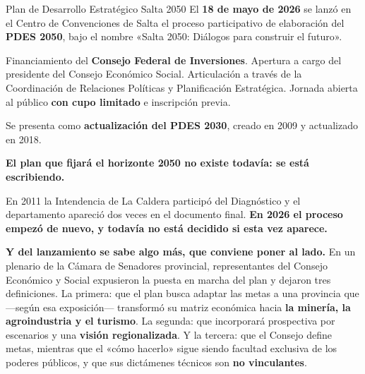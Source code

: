 \begin{ficha}{Plan de Desarrollo Estratégico Salta 2050}
El \textbf{18 de mayo de 2026} se lanzó en el Centro de Convenciones de Salta el proceso
participativo de elaboración del \textbf{PDES 2050}, bajo el nombre «Salta 2050: Diálogos para
construir el futuro».

Financiamiento del \textbf{Consejo Federal de Inversiones}. Apertura a cargo del presidente del
Consejo Económico Social. Articulación a través de la Coordinación de Relaciones Políticas y
Planificación Estratégica. Jornada abierta al público \textbf{con cupo limitado} e inscripción
previa.

Se presenta como \textbf{actualización del PDES 2030}, creado en 2009 y actualizado en 2018.
\end{ficha}

\textbf{El plan que fijará el horizonte 2050 no existe todavía: se está escribiendo.}

En 2011 la Intendencia de La Caldera participó del Diagnóstico y el departamento apareció dos
veces en el documento final. \textbf{En 2026 el proceso empezó de nuevo, y todavía no está
decidido si esta vez aparece.}

\textbf{Y del lanzamiento se sabe algo más, que conviene poner al lado.} En un plenario de la
Cámara de Senadores provincial, representantes del Consejo Económico y Social expusieron la
puesta en marcha del plan y dejaron tres definiciones. La primera: que el plan busca adaptar las
metas a una provincia que ---según esa exposición--- transformó su matriz económica hacia
\textbf{la minería, la agroindustria y el turismo}. La segunda: que incorporará prospectiva por
escenarios y una \textbf{visión regionalizada}. Y la tercera: que el Consejo define metas,
mientras que el «cómo hacerlo» sigue siendo facultad exclusiva de los poderes públicos, y que
sus dictámenes técnicos son \textbf{no vinculantes}.

